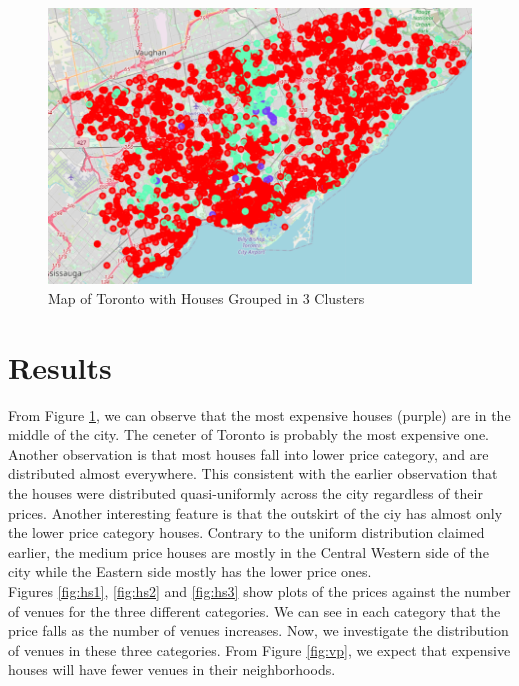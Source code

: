 \documentclass{article}
\begin{document}
\begin{figure}[hbt!]
	
	\includegraphics[width=\textwidth]{map2.png}
	\caption{Map of Toronto with Houses Grouped in 3 Clusters}
	\label{fig:map2}
	
\end{figure}

\section{Results}

From Figure \ref{fig:map2}, we can observe that the most expensive houses (purple) are in the middle of the city. The ceneter of Toronto is probably the most expensive one. Another observation is that most houses fall into lower price category, and are distributed almost everywhere. This consistent with the earlier observation that the houses were distributed quasi-uniformly across the city regardless of their prices. Another interesting feature is that the outskirt of the ciy has almost only the lower price category houses. Contrary to the uniform distribution claimed earlier, the medium price houses are mostly in the Central Western side of the city while the Eastern side mostly has the lower price ones. \\

Figures \ref{fig:hs1}, \ref{fig:hs2} and \ref{fig:hs3} show plots of the prices against the number of venues for the three different categories. We can see in each category that the price falls as the number of venues increases. Now, we investigate the distribution of venues in these three categories. From Figure \ref{fig:vp}, we expect that expensive houses will have fewer venues in their neighborhoods. 
\end{document}
